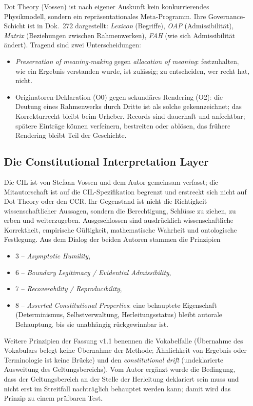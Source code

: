 Dot Theory (Vossen) ist nach eigener Auskunft kein konkurrierendes Physikmodell, sondern
ein repräsentationales Meta-Programm. Ihre Governance-Schicht ist in Dok.~272
dargestellt: \emph{Lexicon} (Begriffe), \emph{OAP} (Admissibilität), \emph{Matrix}
(Beziehungen zwischen Rahmenwerken), \emph{FAH} (wie sich Admissibilität ändert).
Tragend sind zwei Unterscheidungen:
\begin{itemize}
\item \emph{Preservation of meaning-making} gegen \emph{allocation of meaning}: festzuhalten,
  wie ein Ergebnis verstanden wurde, ist zulässig; zu entscheiden, wer recht hat, nicht.
\item Originatoren-Deklaration (O0) gegen sekundäres Rendering (O2): die Deutung eines
  Rahmenwerks durch Dritte ist als solche gekennzeichnet; das Korrekturrecht bleibt beim
  Urheber. Records sind dauerhaft und anfechtbar; spätere Einträge können verfeinern,
  bestreiten oder ablösen, das frühere Rendering bleibt Teil der Geschichte.
\end{itemize}

\subsection{Die Constitutional Interpretation Layer}

Die CIL ist von Stefaan Vossen und dem Autor gemeinsam verfasst; die Mitautorschaft ist
auf die CIL-Spezifikation begrenzt und erstreckt sich nicht auf Dot Theory oder den CCR.
Ihr Gegenstand ist nicht die Richtigkeit wissenschaftlicher Aussagen, sondern die
Berechtigung, Schlüsse zu ziehen, zu erben und weiterzugeben. Ausgeschlossen sind
ausdrücklich wissenschaftliche Korrektheit, empirische Gültigkeit, mathematische Wahrheit
und ontologische Festlegung. Aus dem Dialog der beiden Autoren stammen die Prinzipien
\begin{itemize}
\item 3 -- \emph{Asymptotic Humility},
\item 6 -- \emph{Boundary Legitimacy / Evidential Admissibility},
\item 7 -- \emph{Recoverability / Reproducibility},
\item 8 -- \emph{Asserted Constitutional Properties}: eine behauptete Eigenschaft
  (Determinismus, Selbstverwaltung, Herleitungsstatus) bleibt autorale Behauptung, bis sie
  unabhängig rückgewinnbar ist.
\end{itemize}
Weitere Prinzipien der Fassung v1.1 benennen die Vokabelfalle (Übernahme des Vokabulars
belegt keine Übernahme der Methode; Ähnlichkeit von Ergebnis oder Terminologie ist keine
Brücke) und den \emph{constitutional drift} (undeklarierte Ausweitung des Geltungsbereichs).
Vom Autor ergänzt wurde die Bedingung, dass der Geltungsbereich an der Stelle der
Herleitung deklariert sein muss und nicht erst im Streitfall nachträglich behauptet
werden kann; damit wird das Prinzip zu einem prüfbaren Test.

